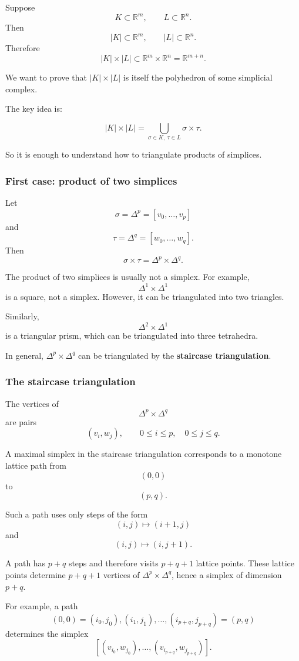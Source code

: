 \documentclass[12pt,a4paper]{article}
\theoremstyle{notespace}
\begin{document}
Suppose
\[
K\subset \mathbb R^m,
\qquad
L\subset \mathbb R^n.
\]
Then
\[
|K|\subset \mathbb R^m,
\qquad
|L|\subset \mathbb R^n.
\]
Therefore
\[
|K|\times |L|\subset \mathbb R^m\times \mathbb R^n
=
\mathbb R^{m+n}.
\]

We want to prove that \(|K|\times |L|\) is itself the polyhedron of some simplicial complex.

The key idea is:

\[
|K|\times |L|
=
\bigcup_{\sigma\in K,\ \tau\in L}
\sigma\times \tau.
\]

So it is enough to understand how to triangulate products of simplices.

\subsubsection{First case: product of two simplices}

Let
\[
\sigma=\Delta^p=[v_0,\dots,v_p]
\]
and
\[
\tau=\Delta^q=[w_0,\dots,w_q].
\]
Then
\[
\sigma\times \tau
=
\Delta^p\times \Delta^q.
\]

The product of two simplices is usually not a simplex. For example,
\[
\Delta^1\times \Delta^1
\]
is a square, not a simplex. However, it can be triangulated into two triangles.

Similarly,
\[
\Delta^2\times \Delta^1
\]
is a triangular prism, which can be triangulated into three tetrahedra.

In general, \(\Delta^p\times \Delta^q\) can be triangulated by the \textbf{staircase triangulation}.

\subsubsection{The staircase triangulation}

The vertices of
\[
\Delta^p\times \Delta^q
\]
are pairs
\[
(v_i,w_j),
\qquad
0\leq i\leq p,\quad 0\leq j\leq q.
\]

A maximal simplex in the staircase triangulation corresponds to a monotone lattice path from
\[
(0,0)
\]
to
\[
(p,q).
\]

Such a path uses only steps of the form
\[
(i,j)\mapsto (i+1,j)
\]
and
\[
(i,j)\mapsto (i,j+1).
\]

A path has \(p+q\) steps and therefore visits \(p+q+1\) lattice points. These lattice points determine \(p+q+1\) vertices of \(\Delta^p\times \Delta^q\), hence a simplex of dimension \(p+q\).

For example, a path
\[
(0,0)=(i_0,j_0),(i_1,j_1),\dots,(i_{p+q},j_{p+q})=(p,q)
\]
determines the simplex
\[
[(v_{i_0},w_{j_0}),\dots,(v_{i_{p+q}},w_{j_{p+q}})].
\]
\end{document}
